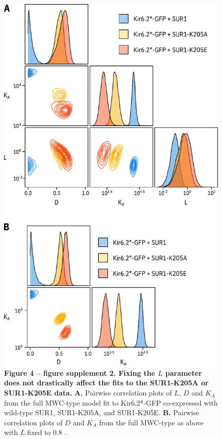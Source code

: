 \documentclass[10pt,lineno, doublespacing]{elife}
\begin{document}
\begin{figure}
\begin{fullwidth}
\centering
\includegraphics[height=0.88\textheight]{figure_four_s2}
\captionsetup{labelformat=empty}
\caption{
\textbf{Figure 4 -- figure supplement 2. Fixing the $L$ parameter does not drastically affect the fits to the SUR1-K205A or SUR1-K205E data.}
\textbf{A.}
Pairwise correlation plots of $L$, $D$ and $K_A$ from the full MWC-type model fit to Kir6.2*-GFP co-expressed with wild-type SUR1, SUR1-K205A, and SUR1-K205E.
\textbf{B.}
Pairwise correlation plots of $D$ and $K_A$ from the full MWC-type as above with $L$ fixed to 0.8 \citep{RN92}.
}
\label{fig:four_s2}
\end{fullwidth}
\end{figure}
\end{document}
